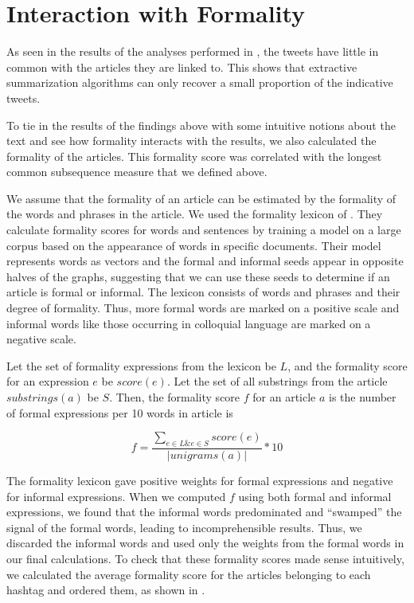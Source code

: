 \section{Interaction with Formality}

As seen in the results of the analyses performed in , the tweets have little in common with the articles they are linked to. This shows that extractive summarization algorithms can only recover a small proportion of the indicative tweets. 

To tie in the results of the findings above with some intuitive notions about the text and see how formality interacts with the results, we also calculated the formality of the articles. This formality score was correlated with the longest common subsequence measure that we defined above. 

We assume that the formality of an article can be estimated by the formality of the words and phrases in the article. We used the formality lexicon of . They calculate formality scores for words and sentences by training a model on a large corpus based on the appearance of words in specific documents. Their model represents words as vectors and the formal and informal seeds appear in opposite halves of the graphs, suggesting that we can use these seeds to determine if an article is formal or informal. The lexicon consists of words and phrases and their degree of formality. Thus, more formal words are marked on a positive scale and informal words like those occurring in colloquial language are marked on a negative scale. 

Let the set of formality expressions from the lexicon be $L$, and the formality score for an expression $e$ be $\textit{score}(e)$. Let the set of all substrings from the article $\textit{substrings}(a)$ be $S$. Then, the formality score $f$ for an article $a$ is the number of formal expressions per 10 words in article is   

\begin{equation}
f = \frac{\sum\limits_{e \in L \& e \in S} \textit{score}(e)}{| unigrams(a) |} * 10
\end{equation}

The formality lexicon gave positive weights for formal expressions and negative for informal expressions. When we computed $f$ using both formal and informal expressions, we found that the informal words predominated and ``swamped'' the signal of the formal words, leading to incomprehensible results. Thus, we discarded the informal words and used only the weights from the formal words in our final calculations. To check that these formality scores made sense intuitively, we calculated the average formality score for the articles belonging to each hashtag and ordered them, as shown in .

